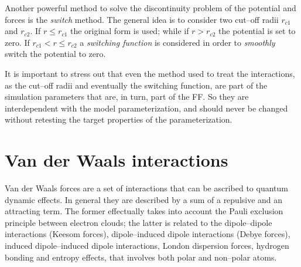 Another powerful method to solve the discontinuity problem of the potential and forces is the \textit{switch}
method. The general idea is to consider two cut--off radii  $r_{c1}$ and $r_{c2}$. If $r \le r_{c1}$ the original
form is used; while if $r > r_{c2}$ the potential is set to zero. If $r_{c1} < r \le r_{c2}$ a \textit{switching
function} is considered in order to \textit{smoothly} switch the potential to zero.

It is important to stress out that even the method used to treat the interactions, as the cut--off radii and
eventually the switching function, are part of the simulation parameters that are, in turn, part of the \ac{FF}.
So they are interdependent with the model parameterization, and should never be changed without retesting the
target properties of the parameterization.

\section{Van der Waals interactions}
Van der Waals forces are a set of interactions that can be ascribed to quantum dynamic effects. In general they
are described by a sum of a repulsive and an attracting term. The former effectually takes into account the Pauli
exclusion principle between electron clouds; the latter is related to the dipole--dipole interactions (Keesom
forces), dipole--induced dipole interactions (Debye forces), induced dipole--induced dipole interactions, London
dispersion forces, hydrogen bonding and entropy effects, that involves both polar and non--polar atoms.

